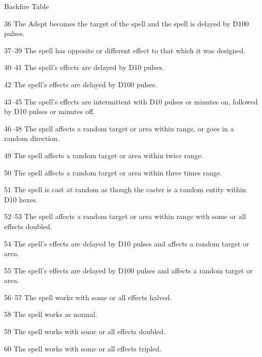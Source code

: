 \begin{Chapter}{Backfire Table}
\begin{Description}
\item[36] The Adept becomes the target of the spell and the spell is
  delayed by D100 pulses.

\item[37--39] The spell has opposite or different effect to that which
  it was designed.

\item[40--41] The spell’s effects are delayed by D10 pulses.

\item[42] The spell’s effects are delayed by D100 pulses.

\item[43--45] The spell’s effects are intermittent with D10 pulses or
  minutes on, followed by D10 pulses or minutes off.

\item[46--48] The spell affects a random target or area within range,
  or goes in a random direction.

\item[49] The spell affects a random target or area within twice
  range.

\item[50] The spell affects a random target or area within three times
  range.

\item[51] The spell is cast at random as though the caster is a random
  entity within D10 hexes.

\item[52--53] The spell affects a random target or area within range
  with some or all effects doubled.

\item[54] The spell’s effects are delayed by D10 pulses and affects a
  random target or area.

\item[55] The spell’s effects are delayed by D100 pulses and affects a
  random target or area.

\item[56--57] The spell works with some or all effects halved.

\item[58] The spell works as normal.

\item[59] The spell works with some or all effects doubled.

\item[60] The spell works with some or all effects tripled.

\end{Description}



\end{Chapter}
